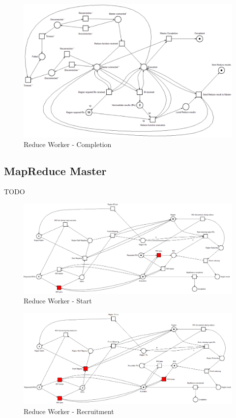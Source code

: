 \begin{figure}[!ht]
    \centering
    \includegraphics[width=\linewidth]{document/chapters/chapter_6/images/reduce_worker_petri_net_6.png}
    \caption{Reduce Worker - Completion}
    \label{fig:map_worker_petri_net_6}
\end{figure}

\subsection{MapReduce Master}
TODO

\begin{figure}[!ht]
    \centering
    \includegraphics[width=\linewidth]{document/chapters/chapter_6/images/master_petri_net_1.png}
    \caption{Reduce Worker - Start}
    \label{fig:master_petri_net_1}
\end{figure}

\begin{figure}[!ht]
    \centering
    \includegraphics[width=\linewidth]{document/chapters/chapter_6/images/master_petri_net_2.png}
    \caption{Reduce Worker - Recruitment}
    \label{fig:master_petri_net_2}
\end{figure}

